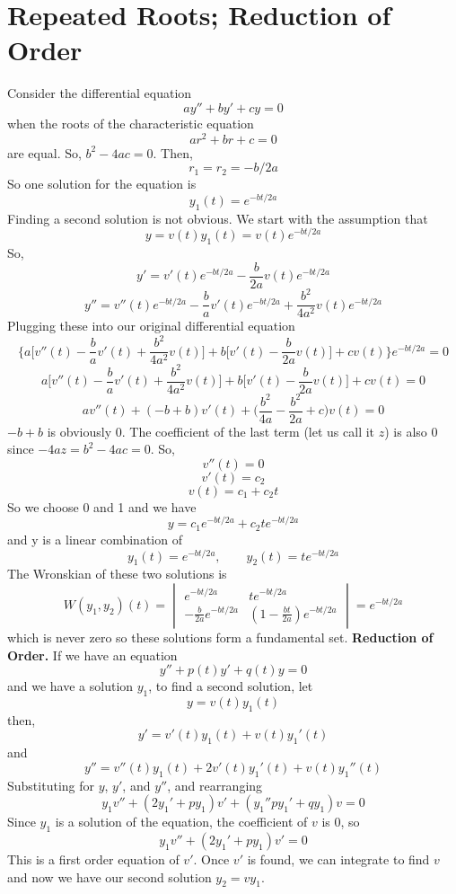 \section{Repeated Roots; Reduction of Order}
    Consider the differential equation
    $$ay'' + by' + cy = 0$$
    when the roots of the characteristic equation
    $$ar^2 + br + c = 0$$
    are equal. So, $b^2 - 4ac = 0$. Then,
    $$r_1 = r_2 = -b/2a$$
    So one solution for the equation is
    $$y_1(t) = e^{-bt/2a}$$
    Finding a second solution is not obvious. We start with the assumption that
    $$y = v(t)y_1(t) = v(t)e^{-bt/2a}$$
    So,
    $$y' = v'(t)e^{-bt/2a} - \frac{b}{2a}v(t)e^{-bt/2a}$$
    $$y'' = v''(t)e^{-bt/2a} - \frac{b}{a}v'(t)e^{-bt/2a} + \frac{b^2}{4a^2}v(t)e^{-bt/2a}$$
    Plugging these into our original differential equation
    \begin{equation*}
        \big\{ a\big [v''(t) - \frac{b}{a}v'(t) + \frac{b^2}{4a^2}v(t) \big] + b\big [ v'(t) - \frac{b}{2a}v(t) \big ] + cv(t) \big\}e^{-bt/2a} = 0
    \end{equation*}
    $$a\big [v''(t) - \frac{b}{a}v'(t) + \frac{b^2}{4a^2}v(t) \big] + b\big [ v'(t) - \frac{b}{2a}v(t) \big ] + cv(t) = 0$$
    $$av''(t) + (-b + b)v'(t) + \big(\frac{b^2}{4a} - \frac{b^2}{2a} + c \big)v(t) = 0$$
    $-b + b$ is obviously 0. The coefficient of the last term (let us call it $z$) is also 0 since $-4az = b^2 - 4ac = 0$. So,
    $$v''(t) = 0$$
    $$v'(t) = c_2$$
    $$v(t) = c_1 + c_2t$$
    So we choose 0 and 1 and we have
    $$y = c_1e^{-bt/2a} + c_2te^{-bt/2a}$$
    and y is a linear combination of 
    $$y_1(t) = e^{-bt/2a}, \qquad y_2(t) = te^{-bt/2a} $$
    The Wronskian of these two solutions is
    \begin{equation*}
        W(y_1, y_2)(t) = \begin{vmatrix}
            e^{-bt/2a} & te^{-bt/2a} \\
            -\frac{b}{2a}e^{-bt/2a} & (1 - \frac{bt}{2a})e^{-bt/2a}
        \end{vmatrix} = e^{-bt/2a}
    \end{equation*}
    which is never zero so these solutions form a fundamental set.
    \newline
    \textbf{Reduction of Order.} If we have an equation
    $$y'' + p(t)y' + q(t)y = 0$$
    and we have a solution $y_1$, to find a second solution, let
    $$y = v(t)y_1(t)$$
    then,
    $$y' = v'(t)y_1(t) + v(t)y_1'(t)$$
    and
    $$y'' = v''(t)y_1(t) + 2v'(t)y_1'(t) + v(t)y_1''(t)$$
    Substituting for $y$, $y'$, and $y''$, and rearranging
    $$y_1v'' + (2y_1' + py_1)v' + (y_1'' py_1' + qy_1)v = 0$$
    Since $y_1$ is a solution of the equation, the coefficient of $v$ is 0, so 
    $$y_1v'' + (2y_1' + py_1)v' = 0$$
    This is a first order equation of $v'$. Once $v'$ is found, we can integrate to find $v$ and now we have our second solution $y_2 = vy_1$.